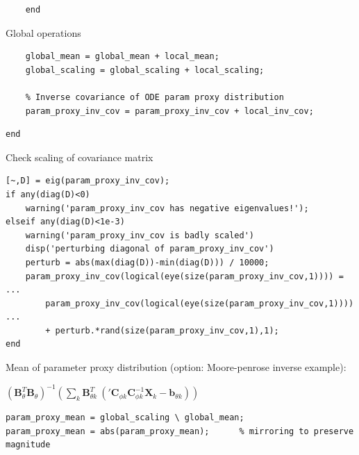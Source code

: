 \color{black}
\color{RoyalPurple}\begin{verbatim}
    end
\end{verbatim}
\color{black}
\begin{par}
Global operations
\end{par} \vspace{1em}
\color{RoyalPurple}\begin{verbatim}
    global_mean = global_mean + local_mean;
    global_scaling = global_scaling + local_scaling;

    % Inverse covariance of ODE param proxy distribution
    param_proxy_inv_cov = param_proxy_inv_cov + local_inv_cov;
\end{verbatim}
\color{black}
\color{RoyalPurple}\begin{verbatim}
end
\end{verbatim}
\color{black}
\begin{par}
Check scaling of covariance matrix
\end{par} \vspace{1em}
\color{RoyalPurple}\begin{verbatim}
[~,D] = eig(param_proxy_inv_cov);
if any(diag(D)<0)
    warning('param_proxy_inv_cov has negative eigenvalues!');
elseif any(diag(D)<1e-3)
    warning('param_proxy_inv_cov is badly scaled')
    disp('perturbing diagonal of param_proxy_inv_cov')
    perturb = abs(max(diag(D))-min(diag(D))) / 10000;
    param_proxy_inv_cov(logical(eye(size(param_proxy_inv_cov,1)))) = ...
        param_proxy_inv_cov(logical(eye(size(param_proxy_inv_cov,1)))) ...
        + perturb.*rand(size(param_proxy_inv_cov,1),1);
end
\end{verbatim}
\color{black}
\begin{par}
Mean of parameter proxy distribution (option: Moore-penrose inverse example):
\end{par} \vspace{1em}
\begin{par}
$\left( \mathbf{B}_{\theta}^T \mathbf{B}_{\theta} \right)^{-1} \left( \sum_k \mathbf{B}_{\theta k}^T ~ \left( {'\mathbf{C}_{\phi k}} \mathbf{C}_{\phi k}^{-1} \mathbf{X}_k - \mathbf{b}_{\theta k} \right) \right)$
\end{par} \vspace{1em}
\color{RoyalPurple}\begin{verbatim}
param_proxy_mean = global_scaling \ global_mean;
param_proxy_mean = abs(param_proxy_mean);      % mirroring to preserve magnitude
\end{verbatim}
\color{black}
